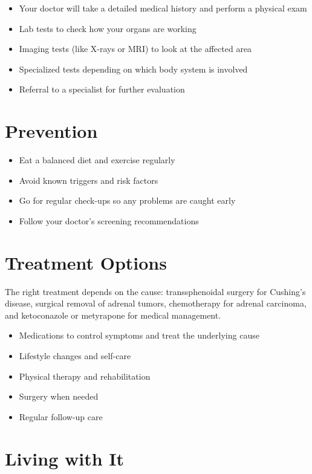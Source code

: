 \begin{itemize}[noitemsep]
  \item Your doctor will take a detailed medical history and perform a physical exam
  \item Lab tests to check how your organs are working
  \item Imaging tests (like X-rays or MRI) to look at the affected area
  \item Specialized tests depending on which body system is involved
  \item Referral to a specialist for further evaluation
\end{itemize}

\section{Prevention}

\begin{itemize}[noitemsep]
  \item Eat a balanced diet and exercise regularly
  \item Avoid known triggers and risk factors
  \item Go for regular check-ups so any problems are caught early
  \item Follow your doctor's screening recommendations
\end{itemize}

\section{Treatment Options}
The right treatment depends on the cause: transsphenoidal surgery for Cushing's disease, surgical removal of adrenal tumors, chemotherapy for adrenal carcinoma, and ketoconazole or metyrapone for medical management.

\begin{itemize}[noitemsep]
  \item Medications to control symptoms and treat the underlying cause
  \item Lifestyle changes and self-care
  \item Physical therapy and rehabilitation
  \item Surgery when needed
  \item Regular follow-up care
\end{itemize}

\section{Living with It}

